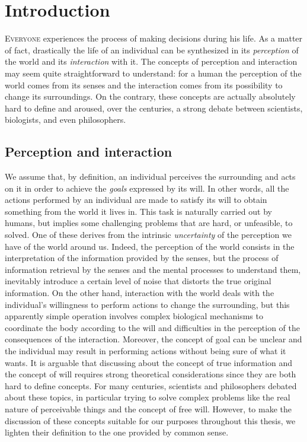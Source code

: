 \chapter{Introduction}\label{C:intro}
\lettrine{E}{veryone} experiences the process of making decisions during his life. As a matter of fact, drastically the life of an individual can be synthesized in its \textit{perception} of the world and its \textit{interaction} with it. The concepts of perception and interaction may seem quite straightforward to understand: for a human the perception of the world comes from its senses and the interaction comes from its possibility to change its surroundings. On the contrary, these concepts are actually absolutely hard to define and aroused, over the centuries, a strong debate between scientists, biologists, and even philosophers.

\section{Perception and interaction}
We assume that, by definition, an individual perceives the surrounding and acts on it in order to achieve the \textit{goals} expressed by its will. In other words, all the actions performed by an individual are made to satisfy its will to obtain something from the world it lives in. This task is naturally carried out by humans, but implies some challenging problems that are hard, or unfeasible, to solved. One of these derives from the intrinsic \textit{uncertainty} of the perception we have of the world around us. Indeed, the perception of the world consists in the interpretation of the information provided by the senses, but the process of information retrieval by the senses and the mental processes to understand them, inevitably introduce a certain level of noise that distorts the true original information. On the other hand, interaction with the world deals with the individual's willingness to perform actions to change the surrounding, but this apparently simple operation involves complex biological mechanisms to coordinate the body according to the will and difficulties in the perception of the consequences of the interaction. Moreover, the concept of goal can be unclear and the individual may result in performing actions without being sure of what it wants.
It is arguable that discussing about the concept of true information and the concept of will requires strong theoretical considerations since they are both hard to define concepts. For many centuries, scientists and philosophers debated about these topics, in particular trying to solve complex problems like the real nature of perceivable things and the concept of free will. However, to make the discussion of these concepts suitable for our purposes throughout this thesis, we lighten their definition to the one provided by common sense.

